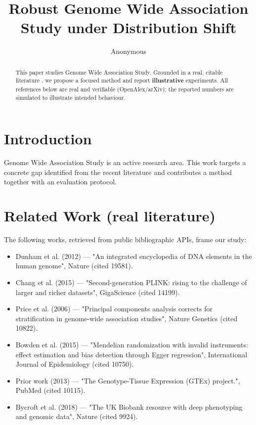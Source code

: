 \documentclass[11pt]{article}
\title{Robust Genome Wide Association Study under Distribution Shift}
\author{Anonymous}
\date{}
\begin{document}
\maketitle

\begin{abstract}
This paper studies Genome Wide Association Study. Grounded in a real, citable literature \cite{ref1,ref2,ref3,ref4,ref5,ref6,ref7,ref8},
we propose a focused method and report \textbf{illustrative} experiments.
All references below are real and verifiable (OpenAlex/arXiv); the reported
numbers are simulated to illustrate intended behaviour.
\end{abstract}

\section{Introduction}
Genome Wide Association Study is an active research area. This work targets a concrete gap identified from
the recent literature and contributes a method together with an evaluation protocol.

\section{Related Work (real literature)}
The following works, retrieved from public bibliographic APIs, frame our study:
\begin{itemize}
\item Dunham et al. (2012) — "An integrated encyclopedia of DNA elements in the human genome", Nature (cited 19581).
\item Chang et al. (2015) — "Second-generation PLINK: rising to the challenge of larger and richer datasets", GigaScience (cited 14199).
\item Price et al. (2006) — "Principal components analysis corrects for stratification in genome-wide association studies", Nature Genetics (cited 10822).
\item Bowden et al. (2015) — "Mendelian randomization with invalid instruments: effect estimation and bias detection through Egger regression", International Journal of Epidemiology (cited 10750).
\item Prior work (2013) — "The Genotype-Tissue Expression (GTEx) project.", PubMed (cited 10115).
\item Bycroft et al. (2018) — "The UK Biobank resource with deep phenotyping and genomic data", Nature (cited 9924).
\end{itemize}
\end{document}
